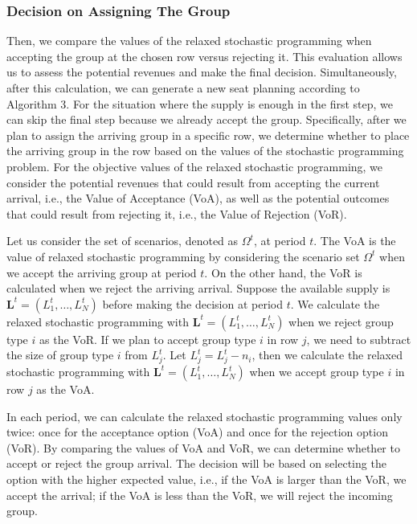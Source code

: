 

\subsubsection*{Decision on Assigning The Group}
Then, we compare the values of the relaxed stochastic programming when accepting the group at the chosen row versus rejecting it. This evaluation allows us to assess the potential revenues and make the final decision. Simultaneously, after this calculation, we can generate a new seat planning according to Algorithm 3. For the situation where the supply is enough in the first step, we can skip the final step because we already accept the group. Specifically, after we plan to assign the arriving group in a specific row, we determine whether to place the arriving group in the row based on the values of the stochastic programming problem. For the objective values of the relaxed stochastic programming, we consider the potential revenues that could result from accepting the current arrival, i.e., the Value of Acceptance (VoA), as well as the potential outcomes that could result from rejecting it, i.e., the Value of Rejection (VoR). 

Let us consider the set of scenarios, denoted as $\Omega^{t}$, at period $t$. The VoA is the value of 
relaxed stochastic programming by considering the scenario set $\Omega^{t}$ when we accept the arriving group at period $t$. On the other hand, the VoR is calculated when we reject the arriving arrival. Suppose the available supply is $\mathbf{L}^{t} = (L_1^{t}, \ldots, L_N^{t})$ before making the decision at period $t$. We calculate the relaxed stochastic programming with $\mathbf{L}^{t}= (L_1^{t}, \ldots, L_N^{t})$ when we reject group type $i$ as the VoR. If we plan to accept group type $i$ in row $j$, we need to subtract the size of group type $i$ from $L_j^{t}$. Let $L_j^{t} = L_j^{t} - n_{i}$, then we calculate the relaxed stochastic programming with $\mathbf{L}^{t}= (L_1^{t}, \ldots, L_N^{t})$ when we accept group type $i$ in row $j$ as the VoA.

In each period, we can calculate the relaxed stochastic programming values only twice: once for the acceptance option (VoA) and once for the rejection option (VoR). By comparing the values of VoA and VoR, we can determine whether to accept or reject the group arrival. The decision will be based on selecting the option with the higher expected value, i.e., if the VoA is larger than the VoR, we accept the arrival; if the VoA is less than the VoR, we will reject the incoming group.

